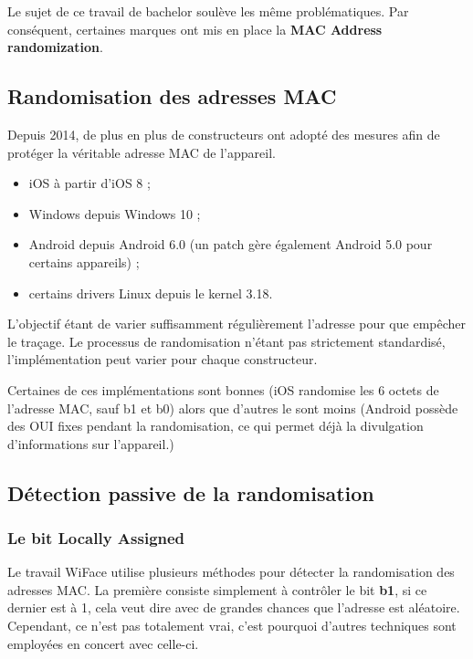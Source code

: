 Le sujet de ce travail de bachelor soulève les même problématiques. Par conséquent, certaines marques
ont mis en place la \textbf{MAC Address randomization}.

\subsection{Randomisation des adresses MAC~\cite{connected:macrandom}}

Depuis 2014, de plus en plus de constructeurs ont adopté des mesures
afin de protéger la véritable adresse MAC de l'appareil. 

\begin{itemize}
    \item iOS à partir d’iOS 8 ;
    \item Windows depuis Windows 10 ;
    \item Android depuis Android 6.0 (un patch gère également Android 5.0 pour certains appareils) ;
    \item certains drivers Linux depuis le kernel 3.18.
\end{itemize}

L'objectif étant de varier suffisamment régulièrement l'adresse pour que empêcher le traçage. 
Le processus de randomisation n'étant pas strictement standardisé, l'implémentation peut varier pour chaque constructeur. 

Certaines de ces implémentations sont bonnes (iOS randomise les 6 octets de l'adresse MAC, sauf b1 et b0) alors que d'autres le sont moins (Android possède des OUI fixes pendant la randomisation, ce qui 
permet déjà la divulgation d'informations sur l'appareil.)

\subsection{Détection passive de la randomisation}

\subsubsection{Le bit Locally Assigned}
Le travail WiFace utilise plusieurs méthodes pour détecter la randomisation des adresses MAC. 
La première consiste simplement à contrôler le bit \textbf{b1}, si ce dernier est à 1, cela veut
dire avec de grandes chances que l'adresse est aléatoire. Cependant, ce n'est pas totalement vrai, c'est pourquoi
d'autres techniques sont employées en concert avec celle-ci. 

